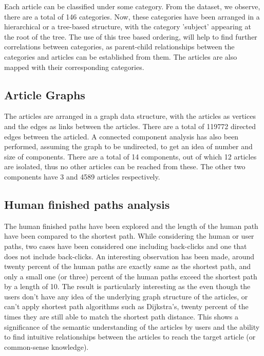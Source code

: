 \documentclass[a4paper,11pt]{article}
\begin{document}
Each article can be classified under some category. From the dataset, we observe, there are a total of 146 categories. Now, these categories have been arranged in a hierarchical or a tree-based structure, with the category 'subject' appearing at the root of the tree. The use of this tree based ordering, will help to find further correlations between categories, as parent-child relationships between the categories and articles can be established from them. The articles are also mapped with their corresponding categories.



\subsection{Article Graphs}
The articles are arranged in a graph data structure, with the articles as vertices and the edges as links between the articles. There are a total of 119772 directed edges between the articled. A connected component analysis has also been performed, assuming the graph to be undirected, to get an idea of number and size of components. There are a total of 14 components, out of which 12 articles are isolated, thus no other articles can be reached from these. The other two components have 3 and 4589 articles respectively.


\subsection{Human finished paths analysis}

The human finished paths have been explored and the length of the human path have been compared to the shortest path. While considering the human or user paths, two cases have been considered one including back-clicks and one that does not include back-clicks. An interesting observation has been made, around twenty percent of the human paths are exactly same as the shortest path, and only a small one (or three) percent of the human paths exceed the shortest path by a length of 10. The result is particularly interesting as the even though the users don't have any idea of the underlying graph structure of the articles, or can't apply shortest path algorithms such as Dijkstra's, twenty percent of the times they are still able to match the shortest path distance. This shows a significance of the semantic understanding of the articles by  users and the ability to find intuitive relationships between the articles to reach the target article  (or common-sense knowledge).
\end{document}
